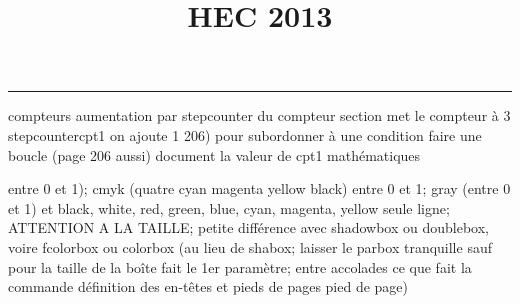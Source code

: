 \documentclass[11pt]{article}%
\title{\bf \vspace{-1cm} HEC 2013} %
\author{} %
\date{} %
\renewcommand{\headrulewidth}{0pt}%
\renewcommand{\footrulewidth}{0.4pt}%
\begin{document}
\maketitle %
\vspace{-1.2cm}\hrule %
\thispagestyle{fancy}

\vspace*{.4cm}


compteurs%
aumentation par stepcounter du compteur section%
met le compteur à 3%
stepcounter{cpt1} on ajoute 1%
206) pour subordonner à une condition %
faire une boucle (page 206 aussi) %
document la valeur de cpt1 
mathématiques\newcommand{\ch}{\operatorname{ch}} 
\newcommand{\sh}{\operatorname{sh}}
\renewcommand{\tanh}{\operatorname{th}}
\renewcommand{\sinh}{\operatorname{sh}}
\renewcommand{\cosh}{\operatorname{ch}}
\newcommand{\argsh}{\operatorname{argsh}}
\newcommand{\argch}{\operatorname{argch}}
\newcommand{\argth}{\operatorname{argth}}
\newcommand{\Id}{\operatorname{Id}}
\newcommand{\id}{\operatorname{id}}
\renewcommand{\im}{\operatorname{Im}}
\renewcommand{\leq}{\leq}
\renewcommand{\geq}{\geq }
\newcommand{\lb}{\llbracket}
\newcommand{\rb}{\rrbracket}

\newcommand{\dlim}{\lim}
\newcommand{\dsum}{\sum}
\newcommand{\dprod}{\prod}



entre 0 et 1); cmyk (quatre cyan magenta yellow black) entre 0 et 1;
gray (entre 0 et 1) et black, white, red, green, blue, cyan, magenta,
yellow%
seule ligne; ATTENTION A LA TAILLE; petite différence avec shadowbox ou
doublebox, voire fcolorbox ou colorbox (au lieu de shabox; laisser le
parbox tranquille sauf pour la taille de la boîte
\newcommand{\Tbox}[1]{\begin{center} \shabox{\parbox{0.6
\linewidth}{#1}} \end{center}} %
fait le 1er paramètre; entre accolades ce que fait la commande
définition des en-têtes et pieds de pages\pagestyle{fancy}
\chead{}
\rfoot[ \ \thepage]{\thepage}
\cfoot{}
\lfoot{}
\thispagestyle{fancy} %
pied de page)\renewcommand{\footrulewidth}{0.4pt}
\renewcommand{\headrulewidth}{0.4pt}
\end{document}
